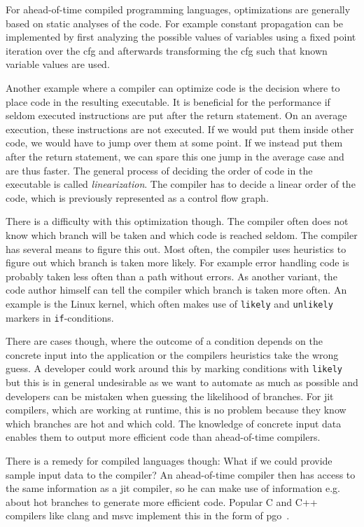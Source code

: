 For ahead-of-time compiled programming languages, optimizations are generally based on static analyses of the code. For example constant propagation can be implemented by first analyzing the possible values of variables using a fixed point iteration over the \gls{cfg} and afterwards transforming the \gls{cfg} such that known variable values are used.~\cite{Seidl2010}

Another example where a compiler can optimize code is the decision where to place code in the resulting executable. It is beneficial for the performance if seldom executed instructions are put after the return statement. On an average execution, these instructions are not executed. If we would put them inside other code, we would have to jump over them at some point. If we instead put them after the return statement, we can spare this one jump in the average case and are thus faster. The general process of deciding the order of code in the executable is called \emph{linearization}. The compiler has to decide a linear order of the code, which is previously represented as a control flow graph.

There is a difficulty with this optimization though. The compiler often does not know which branch will be taken and which code is reached seldom. The compiler has several means to figure this out. Most often, the compiler uses heuristics to figure out which branch is taken more likely. For example error handling code is probably taken less often than a path without errors. As another variant, the code author himself can tell the compiler which branch is taken more often. An example is the Linux kernel, which often makes use of \texttt{likely} and \texttt{unlikely} markers in \texttt{if}-conditions.

There are cases though, where the outcome of a condition depends on the concrete input into the application or the compilers heuristics take the wrong guess. A developer could work around this by marking conditions with \texttt{likely} but this is in general undesirable as we want to automate as much as possible and developers can be mistaken when guessing the likelihood of branches. For \gls{jit} compilers, which are working at runtime, this is no problem because they know which branches are hot and which cold. The knowledge of concrete input data enables them to output more efficient code than ahead-of-time compilers.

There is a remedy for compiled languages though: What if we could provide sample input data to the compiler? An ahead-of-time compiler then has access to the same information as a \gls{jit} compiler, so he can make use of information e.g. about hot branches to generate more efficient code. Popular C and C++ compilers like clang and msvc implement this in the form of \gls{pgo}~\cite{ClangManual, MicrosoftPgo}.

